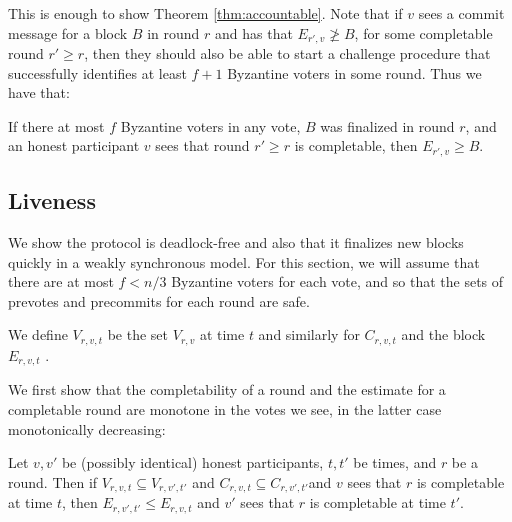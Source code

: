 \documentclass[a4paper,UKenglish,cleveref, autoref, thm-restate, anonymous]{lipics-v2019}
\begin{document}
This is enough to show Theorem \ref{thm:accountable}.  Note that if $v$ sees a commit message for a block $B$ in round $r$ and has that $E_{r',v} \not\geq B$, for some completable round $r' \geq r$, then they should also be able to start a challenge procedure that successfully identifies at least $f+1$ Byzantine voters in some round. Thus we have that:

\begin{corollary} \label{cor:overestimate-final}
If there at most $f$ Byzantine voters in any vote, $B$ was finalized in round $r$, and an honest participant $v$ sees that round $r' \geq r$ is completable, then $E_{r',v} \geq B$.
\end{corollary}

\subsection{Liveness }

We show the protocol is deadlock-free and also that it finalizes new blocks quickly in a weakly synchronous model.
For this section, we will assume that there are at most $f < n/3$ Byzantine voters for each vote, and so that the sets of prevotes and precommits for each round are safe.

We define $V_{r,v,t}$ be the set $V_{r,v}$ at time $t$ and similarly for $C_{r,v,t}$ and the block $E_{r,v,t}$ .

We first show that the completability of a round and the estimate for a completable round are monotone in the votes we see, in the latter case monotonically decreasing: 

\begin{lemma} \label{lem:message-monotonicity-completed-estimate}
Let $v,v'$ be (possibly identical) honest participants, $t,t'$ be times, and $r$ be a round.
Then if $V_{r,v,t} \subseteq V_{r,v',t'}$ and $C_{r,v,t} \subseteq C_{r,v',t'}$and $v$ sees that $r$ is completable at time $t$, then $E_{r,v',t'} \leq E_{r,v,t}$ and $v'$ sees that $r$ is completable at time $t'$.
\end{lemma}
\end{document}
